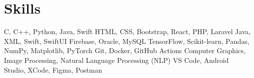 \section{\textbf{Skills}}
\vspace{-0.4mm}
 \resumeHeadingSkillStart
    {C, C++, Python, Java, Swift}
    {HTML, CSS, Bootstrap, React, PHP, Laravel}
    {Java, XML, Swift, SwiftUI}
    {Firebase, Oracle, MySQL}
    {TensorFlow, Scikit-learn, Pandas, NumPy, Matplotlib, PyTorch}
    {Git, Docker, GitHub Actions}
    {Computer Graphics, Image Processing, Natural Language Processing (NLP)}
    {VS Code, Android Studio, XCode, Figma, Postman}
 \resumeHeadingSkillEnd